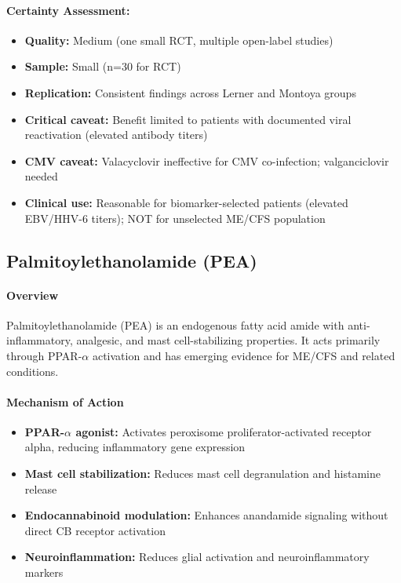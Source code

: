 \paragraph{Certainty Assessment:}
\begin{itemize}
    \item \textbf{Quality:} Medium (one small RCT, multiple open-label studies)
    \item \textbf{Sample:} Small (n=30 for RCT)
    \item \textbf{Replication:} Consistent findings across Lerner and Montoya groups
    \item \textbf{Critical caveat:} Benefit limited to patients with documented viral reactivation (elevated antibody titers)
    \item \textbf{CMV caveat:} Valacyclovir ineffective for CMV co-infection; valganciclovir needed
    \item \textbf{Clinical use:} Reasonable for biomarker-selected patients (elevated EBV/HHV-6 titers); NOT for unselected ME/CFS population
\end{itemize}

\subsection{Palmitoylethanolamide (PEA)}

\paragraph{Overview}

Palmitoylethanolamide (PEA) is an endogenous fatty acid amide with anti-inflammatory, analgesic, and mast cell-stabilizing properties. It acts primarily through PPAR-$\alpha$ activation and has emerging evidence for ME/CFS and related conditions.

\paragraph{Mechanism of Action}

\begin{itemize}
    \item \textbf{PPAR-$\alpha$ agonist:} Activates peroxisome proliferator-activated receptor alpha, reducing inflammatory gene expression
    \item \textbf{Mast cell stabilization:} Reduces mast cell degranulation and histamine release
    \item \textbf{Endocannabinoid modulation:} Enhances anandamide signaling without direct CB receptor activation
    \item \textbf{Neuroinflammation:} Reduces glial activation and neuroinflammatory markers
\end{itemize}

